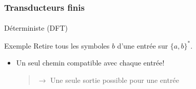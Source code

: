 \frametitle{Transducteurs finis}
\framesubtitle{}

Déterministe (DFT)
	
	
\begin{exampleblock}{Exemple}
	Retire tous les symboles $b$ d'une entrée sur $\{a,b\}^*$.	
\end{exampleblock}


\begin{itemize}
	\item Un seul chemin compatible avec chaque entrée!
	
	\begin{quotation}
		$\rightarrow$ Une seule sortie possible pour une entrée
	\end{quotation}
\end{itemize}
